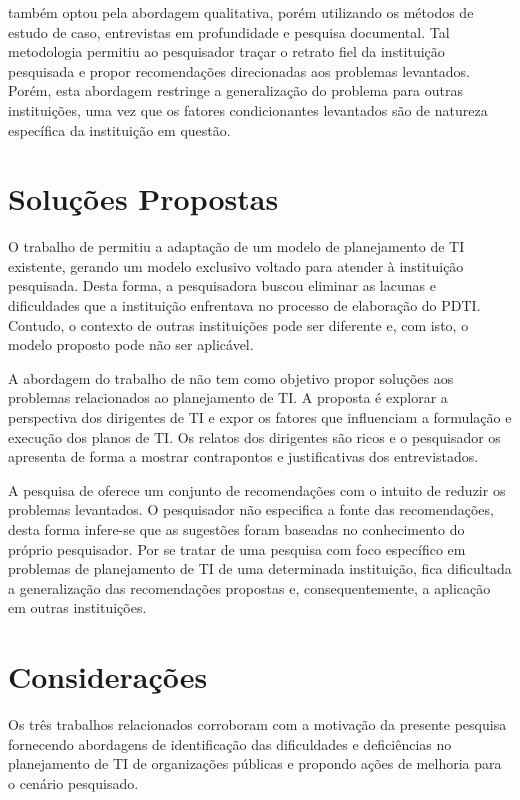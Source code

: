  também optou pela abordagem qualitativa, porém utilizando os métodos de estudo de caso, entrevistas em profundidade e pesquisa documental. Tal metodologia permitiu ao pesquisador traçar o retrato fiel da instituição pesquisada e propor recomendações direcionadas aos problemas levantados. Porém, esta abordagem restringe a generalização do problema para outras instituições, uma vez que os fatores condicionantes levantados são de natureza específica da instituição em questão.

\section{Soluções Propostas}
O trabalho de  permitiu a adaptação de um modelo de planejamento de TI existente, gerando um modelo exclusivo voltado para atender à instituição pesquisada. Desta forma, a pesquisadora buscou eliminar as lacunas e dificuldades que a instituição enfrentava no processo de elaboração do PDTI. Contudo, o contexto de outras instituições pode ser diferente e, com isto, o modelo proposto pode não ser aplicável.

A abordagem do trabalho de  não tem como objetivo propor soluções aos problemas relacionados ao planejamento de TI. A proposta é explorar a perspectiva dos dirigentes de TI e expor os fatores que influenciam a formulação e execução dos planos de TI. Os relatos dos dirigentes são ricos e o pesquisador os apresenta de forma a mostrar contrapontos e justificativas dos entrevistados.

A pesquisa de  oferece um conjunto de recomendações com o intuito de reduzir os problemas levantados. O pesquisador não especifica a fonte das recomendações, desta forma infere-se que as sugestões foram baseadas no conhecimento do próprio pesquisador. Por se tratar de uma pesquisa com foco específico em problemas de planejamento de TI de uma determinada instituição, fica dificultada a generalização das recomendações propostas e, consequentemente, a aplicação em outras instituições.

\section{Considerações}
Os três trabalhos relacionados corroboram com a motivação da presente pesquisa fornecendo abordagens de identificação das dificuldades e deficiências no planejamento de TI de organizações públicas e propondo ações de melhoria para o cenário pesquisado.

